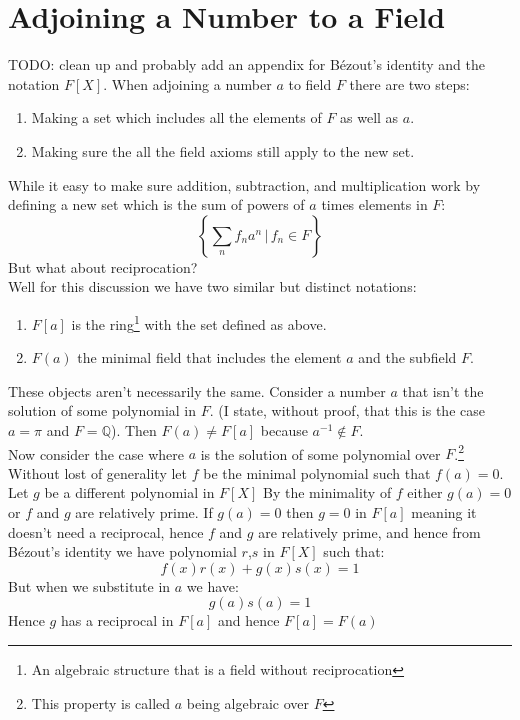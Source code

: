 \section{Adjoining a Number to a Field}
\label{appx:adjoining}
TODO: clean up and probably add an appendix for Bézout's identity and the notation $F[X]$.
When adjoining a number $a$ to field $F$ there are two steps:
\begin{enumerate}
\item Making a set which includes all the elements of $F$ as well as $a$.
\item Making sure the all the field axioms still apply to the new set.
\end{enumerate}
While it easy to make sure addition, subtraction, and multiplication work by defining a new set which is the sum of powers of $a$ times elements in $F$:
\[\left\{\sum_n f_na^n\, |\, f_n \in F\right\}\]
But what about reciprocation? 
\\

Well for this discussion we have two similar but distinct notations:
\begin{enumerate}
	\item $F[a]$ is the ring\footnote{An algebraic structure that is a field without reciprocation} with the set defined as above.
	\item $F(a)$ the minimal field that includes the element $a$ and the subfield $F$.
\end{enumerate}

These objects aren't necessarily the same.
Consider a number $a$ that isn't the solution of some polynomial in $F$.
(I state, without proof, that this is the case $a=\pi$ and $F=\mathbb{Q}$).
Then $F(a) \neq F[a]$ because $a^{-1}  \not \in F$.
\\

Now consider the case where $a$ is the solution of some polynomial over $F$.\footnote{This property is called $a$ being algebraic over $F$}
Without lost of generality let $f$ be the minimal polynomial such that $f(a)=0$.
Let $g$ be a different polynomial in $F[X]$
By the minimality of $f$ either $g(a)=0$ or $f$ and $g$ are relatively prime.
If $g(a)=0$ then $g=0$ in $F[a]$ meaning it doesn't need a reciprocal,
hence $f$ and $g$ are relatively prime,
and hence from Bézout's identity we have polynomial $r$,$s$ in $F[X]$ such that:
\[f(x)r(x)+g(x)s(x) = 1\]
But when we substitute in $a$ we have:
\[g(a)s(a) = 1\]
Hence $g$ has a reciprocal in $F[a]$ and hence $F[a] = F(a)$
\\

